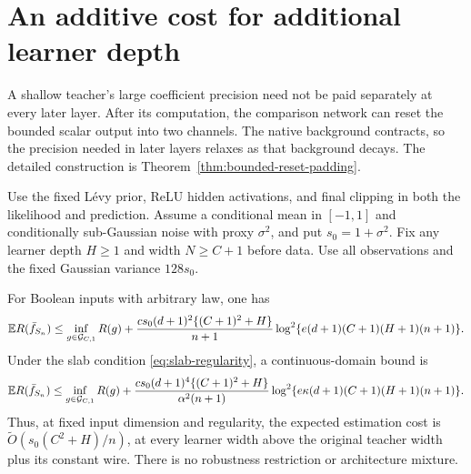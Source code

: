 \section{An additive cost for additional learner depth}
\label{sec:additive-depth}
A shallow teacher's large coefficient precision need not be paid separately at every later layer. After its computation, the comparison network can reset the bounded scalar output into two channels. The native background contracts, so the precision needed in later layers relaxes as that background decays. The detailed construction is Theorem~\ref{thm:bounded-reset-padding}.

\begin{theorem}
\label{thm:shallow-additive-depth}
Use the fixed L\'evy prior, ReLU hidden activations, and final clipping in both the likelihood and prediction. Assume a conditional mean in $[-1,1]$ and conditionally sub-Gaussian noise with proxy $\sigma^2$, and put $s_0=1+\sigma^2$. Fix any learner depth $H\ge1$ and width $N\ge C+1$ before data. Use all observations and the fixed Gaussian variance $128s_0$.

For Boolean inputs with arbitrary law, one has
\begin{equation}
 \mathbb E R(\bar f_{S_n})\le\inf_{g\in\mathcal G_{C,1}}R(g)
 +\frac{c s_0(d+1)^2\{(C+1)^2+H\}}{n+1}
       \log^2\{e(d+1)(C+1)(H+1)(n+1)\}.
 \label{eq:Boolean-additive-depth}
\end{equation}
Under the slab condition \eqref{eq:slab-regularity}, a continuous-domain bound is
\begin{equation}
 \mathbb E R(\bar f_{S_n})\le\inf_{g\in\mathcal G_{C,1}}R(g)
 +\frac{c s_0(d+1)^4\{(C+1)^2+H\}}{\alpha^2(n+1)}
       \log^2\{e\kappa(d+1)(C+1)(H+1)(n+1)\}.
 \label{eq:continuous-additive-depth}
\end{equation}
Thus, at fixed input dimension and regularity, the expected estimation cost is $\widetilde O(s_0(C^2+H)/n)$, at every learner width above the original teacher width plus its constant wire. There is no robustness restriction or architecture mixture.
\end{theorem}
